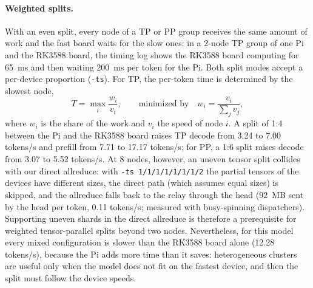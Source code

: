 \documentclass[11pt,a4paper]{article}
\begin{document}
\paragraph{Weighted splits.} With an even split, every node of a TP or PP group receives the same amount of work and the fast board waits for the slow ones: in a 2-node TP group of one Pi and the RK3588 board, the timing log shows the RK3588 board computing for 65~ms and then waiting 200~ms per token for the Pi. Both split modes accept a per-device proportion (\texttt{-ts}). For TP, the per-token time is determined by the slowest node,
\begin{equation}
T = \max_i \frac{w_i}{v_i}, \qquad \text{minimized by} \quad w_i = \frac{v_i}{\sum_j v_j},
\label{eq:weighted}
\end{equation}
where $w_i$ is the share of the work and $v_i$ the speed of node $i$. A split of 1:4 between the Pi and the RK3588 board raises TP decode from 3.24 to 7.00 tokens/s and prefill from 7.71 to 17.17 tokens/s; for PP, a 1:6 split raises decode from 3.07 to 5.52 tokens/s. At 8 nodes, however, an uneven tensor split collides with our direct allreduce: with \texttt{-ts 1/1/1/1/1/1/1/2} the partial tensors of the devices have different sizes, the direct path (which assumes equal sizes) is skipped, and the allreduce falls back to the relay through the head (92~MB sent by the head per token, 0.11 tokens/s; measured with busy-spinning dispatchers). Supporting uneven shards in the direct allreduce is therefore a prerequisite for weighted tensor-parallel splits beyond two nodes. Nevertheless, for this model every mixed configuration is slower than the RK3588 board alone (12.28 tokens/s), because the Pi adds more time than it saves: heterogeneous clusters are useful only when the model does not fit on the fastest device, and then the split must follow the device speeds.
\end{document}
